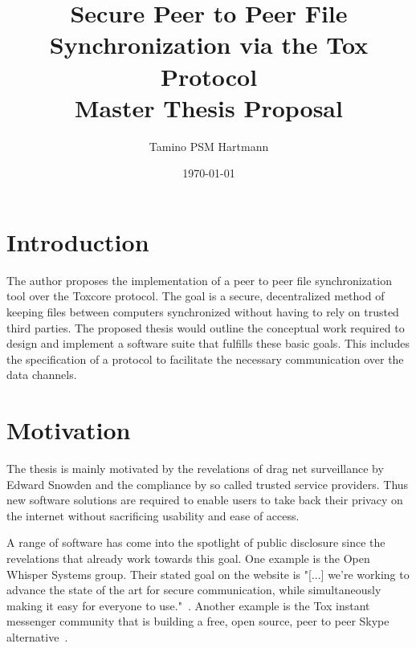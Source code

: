 \documentclass[a4paper,10pt,twoside]{article}
\begin{document}
\title{\textbf{Secure Peer to Peer File Synchronization via the Tox Protocol}\\{\Large Master Thesis Proposal}}
\author{Tamino PSM Hartmann}
\date{\today}
\maketitle

\pagestyle{headings}

\section{Introduction}

The author proposes the implementation of a peer to peer file synchronization tool over the Toxcore protocol.
The goal is a secure, decentralized method of keeping files between computers synchronized without having to rely on trusted third parties.
The proposed thesis would outline the conceptual work required to design and implement a software suite that fulfills these basic goals.
This includes the specification of a protocol to facilitate the necessary communication over the data channels.

\section{Motivation}

The thesis is mainly motivated by the revelations of drag net surveillance by Edward Snowden and the compliance by so called trusted service providers.
Thus new software solutions are required to enable users to take back their privacy on the internet without sacrificing usability and ease of access.

A range of software has come into the spotlight of public disclosure since the revelations that already work towards this goal.
One example is the Open Whisper Systems group.
Their stated goal on the website is "[...] we're working to advance the state of the art for secure communication, while simultaneously making it easy for everyone to use."~\cite{web:site:whispersystems:about}.
Another example is the Tox instant messenger community that is building a free, open source, peer to peer Skype alternative~\cite{web:site:tox}.
\end{document}
